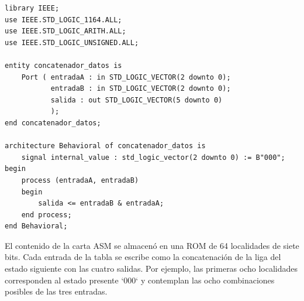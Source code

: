 \documentclass[12pt, letterpaper]{article}
\begin{document}
\begin{lstlisting}[style=vhdl, caption={Código completo del concatenador de datos.}, label={lst:concatenador_datos}]
library IEEE;
use IEEE.STD_LOGIC_1164.ALL;
use IEEE.STD_LOGIC_ARITH.ALL;
use IEEE.STD_LOGIC_UNSIGNED.ALL;

entity concatenador_datos is
    Port ( entradaA : in STD_LOGIC_VECTOR(2 downto 0);
           entradaB : in STD_LOGIC_VECTOR(2 downto 0);
           salida : out STD_LOGIC_VECTOR(5 downto 0)
           );
end concatenador_datos;

architecture Behavioral of concatenador_datos is
    signal internal_value : std_logic_vector(2 downto 0) := B"000";
begin
    process (entradaA, entradaB)
    begin
        salida <= entradaB & entradaA;
    end process;
end Behavioral;
\end{lstlisting}

El contenido de la carta ASM se almacenó en una ROM de 64 localidades de siete bits. Cada entrada de la tabla se escribe como la concatenación de la liga del estado siguiente con las cuatro salidas. Por ejemplo, las primeras ocho localidades corresponden al estado presente `000` y contemplan las ocho combinaciones posibles de las tres entradas.
\end{document}
